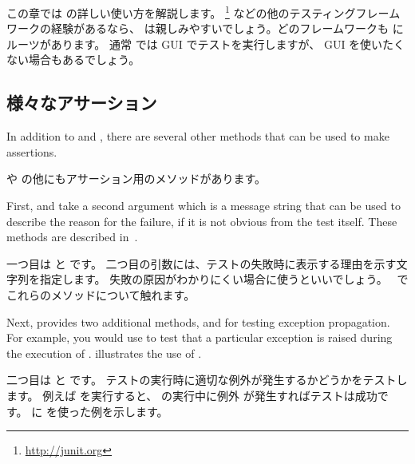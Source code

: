 \documentclass[a4paper,10pt,twoside]{book}
\begin{document}
{この章では \SUnit の詳しい使い方を解説します。
\JUnit\footnote{\url{http://junit.org}} などの他のテスティングフレームワークの経験があるなら、 \SUnit は親しみやすいでしょう。どのフレームワークも \SUnit にルーツがあります。
通常 \SUnit では GUI でテストを実行しますが、 GUI を使いたくない場合もあるでしょう。

\subsection{様々なアサーション}

In addition to  and , there are several other methods that can be used to make assertions.
\fi

 や  の他にもアサーション用のメソッドがあります。

First,  and  take a second argument which is a message string that can be used to describe the reason for the failure, if it is not obvious from the test itself.   These methods are described in~.
\fi

一つ目は  と  です。
二つ目の引数には、テストの失敗時に表示する理由を示す文字列を指定します。
失敗の原因がわかりにくい場合に使うといいでしょう。
~でこれらのメソッドについて触れます。

Next, \sunit provides two additional methods,  and
 for testing exception propagation.
For example, you would use 
 to test that a particular exception is raised during the execution of .  
illustrates the use of \mbox{.}
\fi

二つ目は  と  です。
テストの実行時に適切な例外が発生するかどうかをテストします。
例えば  を実行すると、  の実行中に例外  が発生すればテストは成功です。
 に \mbox{} を使った例を示します。

}
\end{document}
